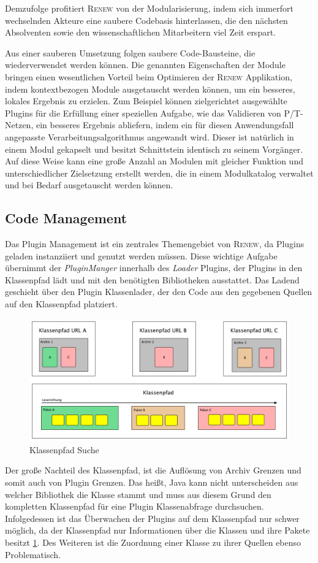 		Demzufolge profitiert \textsc{Renew} von der Modularisierung, indem sich immerfort wechselnden Akteure eine saubere Codebasis hinterlassen, die den nächsten Absolventen sowie den wissenschaftlichen Mitarbeitern viel Zeit erspart. \bigbreak

		Aus einer sauberen Umsetzung folgen saubere Code-Bausteine, die wiederverwendet werden können. Die genannten Eigenschaften der Module bringen einen wesentlichen Vorteil beim Optimieren der \textsc{Renew} Applikation, indem kontextbezogen Module ausgetauscht werden können, um ein besseres, lokales Ergebnis zu erzielen. Zum Beispiel können zielgerichtet ausgewählte Plugins für die Erfüllung einer speziellen Aufgabe, wie das Validieren von P/T-Netzen, ein besseres Ergebnis abliefern, indem ein für diesen Anwendungsfall angepasste Verarbeitungsalgorithmus angewandt wird. Dieser ist natürlich in einem Modul gekapselt und besitzt Schnittstein identisch zu seinem Vorgänger. Auf diese Weise kann eine große Anzahl an Modulen mit gleicher Funktion und unterschiedlicher Zielsetzung erstellt werden, die in einem Modulkatalog verwaltet und bei Bedarf ausgetauscht werden können.

	\subsection{Code Management}\label{sub:code_managment}
		Das Plugin Management ist ein zentrales Themengebiet von \textsc{Renew}, da Plugins geladen instanziiert und genutzt werden müssen. Diese wichtige Aufgabe übernimmt der \textit{PluginManger} innerhalb des \textit{Loader} Plugins, der Plugins in den Klassenpfad lädt und mit den benötigten Bibliotheken ausstattet. Das Ladend geschieht über den Plugin Klassenlader, der den Code aus den gegebenen Quellen auf den Klassenpfad platziert.\bigbreak
		\begin{figure}[t]
		  \centering
		  \includegraphics[width=\textwidth]{material/images/Klassenpfad.pdf}
		  \caption{Klassenpfad Suche}
		  \label{fig:CP_Struktur}
		\end{figure}
		Der große Nachteil des Klassenpfad, ist die Auflösung von Archiv Grenzen und somit auch von Plugin Grenzen. Das heißt, Java kann nicht unterscheiden aus welcher Bibliothek die Klasse stammt und muss aus diesem Grund den kompletten Klassenpfad für eine Plugin Klassenabfrage durchsuchen. Infolgedessen ist das Überwachen der Plugins auf dem Klassenpfad nur schwer möglich, da der Klassenpfad nur Informationen über die Klassen und ihre Pakete besitzt \ref{fig:CP_Struktur}. Des Weiteren ist die Zuordnung einer Klasse zu ihrer Quellen ebenso Problematisch.\bigbreak

